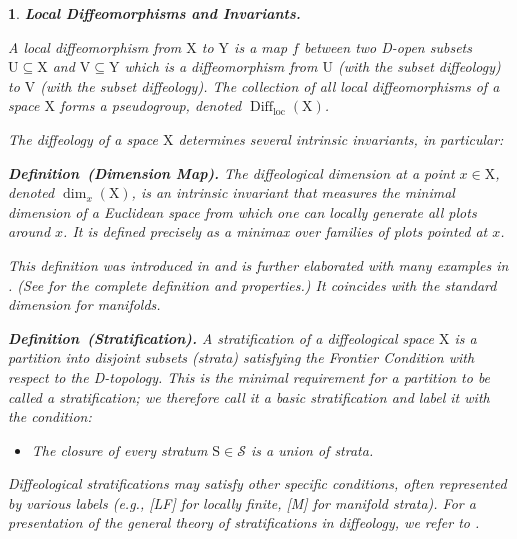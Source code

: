 \documentclass[10pt,reqno,letterpaper,twoside]{amsart}
\theoremstyle{article}
\newtheorem{article}{}
\def\artlabel[#1]{\textbf{#1.}}
\newenvironment{definition}[1]%
{\noindent\textbf{Definition#1.} \it}%
{}
\newcommand{\cS}{{\mathcal S}}
\def \S{\mathrm S}
\def \U{\mathrm U}
\def \V{\mathrm V}
\def \X{\mathrm X}
\def \Y{\mathrm Y}
\DeclareMathOperator{\Diff}{Diff}
\newcommand{\loc}{\mathrm{loc}}
\begin{document}
  \begin{article}
    \artlabel[Local Diffeomorphisms and Invariants]
    \label{Local_Diffeomorphisms_and_Invariants}
    
    
    A \emph{local diffeomorphism} from $\X$ to $\Y$ is a map $f$ between two D-open subsets $\U \subseteq \X$ and $\V \subseteq \Y$ which is a diffeomorphism from $\U$ (with the subset diffeology) to $\V$ (with the subset diffeology).
    The collection of all local diffeomorphisms of a space $\X$ forms a pseudogroup,
    denoted $\Diff_\loc(\X)$.
    
    The diffeology of a space $\X$ determines several intrinsic invariants,
    in particular:
    
    \begin{definition}{~(Dimension Map)}
      \label{def:Dimension_Map}
      The \emph{diffeological dimension} at a point $x \in \X$,
      denoted $\dim_x(\X)$,
      is an intrinsic invariant that measures the minimal dimension of a Euclidean space from which one can locally generate all plots around $x$.
      It is defined precisely as a minimax over families of plots pointed at $x$.
    \end{definition}
    
    This definition was introduced in \cite{PIZ07} and is further elaborated with many examples in \cite{PIZ13}.
    (See \cite[Chapter 2]{PIZ13} for the complete definition and properties.)
    It coincides with the standard dimension for manifolds.
    
    \begin{definition}{~(Stratification)}
      \label{def:Stratification}
      A \emph{stratification} of a diffeological space $\X$ is a partition into disjoint subsets (strata) satisfying the \emph{Frontier Condition} with respect to the D-topology.
      This is the minimal requirement for a partition to be called a stratification;
      we therefore call it a \emph{basic stratification} and label it with the condition:
      \begin{itemize}
        \item[{[B]}] The closure of every stratum $\S \in \cS$ is a union of strata.
      \end{itemize}
    \end{definition}
    
    Diffeological stratifications may satisfy other specific conditions,
    often represented by various labels (e.g., [LF] for locally finite, [M] for manifold strata).
    For a presentation of the general theory of stratifications in diffeology,
    we refer to \cite{GIZ23}.
    

\end{article}
\end{document}
